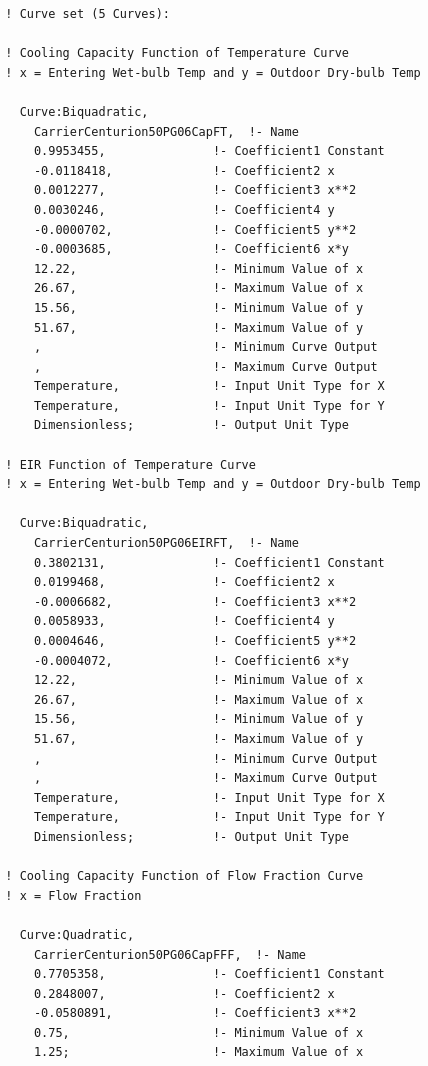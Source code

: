 \begin{lstlisting}
  ! Curve set (5 Curves):

  ! Cooling Capacity Function of Temperature Curve
  ! x = Entering Wet-bulb Temp and y = Outdoor Dry-bulb Temp

    Curve:Biquadratic,
      CarrierCenturion50PG06CapFT,  !- Name
      0.9953455,               !- Coefficient1 Constant
      -0.0118418,              !- Coefficient2 x
      0.0012277,               !- Coefficient3 x**2
      0.0030246,               !- Coefficient4 y
      -0.0000702,              !- Coefficient5 y**2
      -0.0003685,              !- Coefficient6 x*y
      12.22,                   !- Minimum Value of x
      26.67,                   !- Maximum Value of x
      15.56,                   !- Minimum Value of y
      51.67,                   !- Maximum Value of y
      ,                        !- Minimum Curve Output
      ,                        !- Maximum Curve Output
      Temperature,             !- Input Unit Type for X
      Temperature,             !- Input Unit Type for Y
      Dimensionless;           !- Output Unit Type

  ! EIR Function of Temperature Curve
  ! x = Entering Wet-bulb Temp and y = Outdoor Dry-bulb Temp

    Curve:Biquadratic,
      CarrierCenturion50PG06EIRFT,  !- Name
      0.3802131,               !- Coefficient1 Constant
      0.0199468,               !- Coefficient2 x
      -0.0006682,              !- Coefficient3 x**2
      0.0058933,               !- Coefficient4 y
      0.0004646,               !- Coefficient5 y**2
      -0.0004072,              !- Coefficient6 x*y
      12.22,                   !- Minimum Value of x
      26.67,                   !- Maximum Value of x
      15.56,                   !- Minimum Value of y
      51.67,                   !- Maximum Value of y
      ,                        !- Minimum Curve Output
      ,                        !- Maximum Curve Output
      Temperature,             !- Input Unit Type for X
      Temperature,             !- Input Unit Type for Y
      Dimensionless;           !- Output Unit Type

  ! Cooling Capacity Function of Flow Fraction Curve
  ! x = Flow Fraction

    Curve:Quadratic,
      CarrierCenturion50PG06CapFFF,  !- Name
      0.7705358,               !- Coefficient1 Constant
      0.2848007,               !- Coefficient2 x
      -0.0580891,              !- Coefficient3 x**2
      0.75,                    !- Minimum Value of x
      1.25;                    !- Maximum Value of x


\end{lstlisting}
